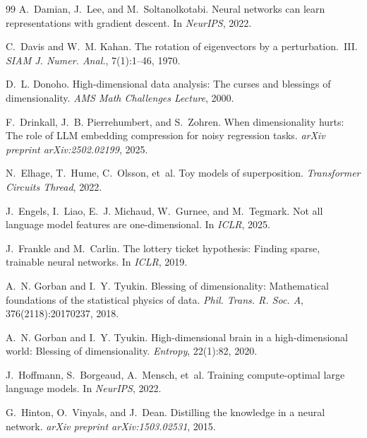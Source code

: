 \documentclass[11pt,a4paper]{article}
\theoremstyle{plain}
\theoremstyle{definition}
\theoremstyle{remark}
\begin{document}
\begin{thebibliography}{99}
A.~Damian, J.~Lee, and M.~Soltanolkotabi.
\newblock Neural networks can learn representations with gradient descent.
\newblock In \emph{NeurIPS}, 2022.

C.~Davis and W.~M. Kahan.
\newblock The rotation of eigenvectors by a perturbation.~{III}.
\newblock \emph{SIAM J. Numer. Anal.}, 7(1):1--46, 1970.

D.~L. Donoho.
\newblock High-dimensional data analysis: The curses and blessings of
  dimensionality.
\newblock \emph{AMS Math Challenges Lecture}, 2000.

F.~Drinkall, J.~B. Pierrehumbert, and S.~Zohren.
\newblock When dimensionality hurts: The role of {LLM} embedding compression for
  noisy regression tasks.
\newblock \emph{arXiv preprint arXiv:2502.02199}, 2025.

N.~Elhage, T.~Hume, C.~Olsson, et~al.
\newblock Toy models of superposition.
\newblock \emph{Transformer Circuits Thread}, 2022.

J.~Engels, I.~Liao, E.~J. Michaud, W.~Gurnee, and M.~Tegmark.
\newblock Not all language model features are one-dimensional.
\newblock In \emph{ICLR}, 2025.

J.~Frankle and M.~Carlin.
\newblock The lottery ticket hypothesis: Finding sparse, trainable neural
  networks.
\newblock In \emph{ICLR}, 2019.

A.~N. Gorban and I.~Y. Tyukin.
\newblock Blessing of dimensionality: Mathematical foundations of the
  statistical physics of data.
\newblock \emph{Phil. Trans. R. Soc. A}, 376(2118):20170237, 2018.

A.~N. Gorban and I.~Y. Tyukin.
\newblock High-dimensional brain in a high-dimensional world: Blessing of
  dimensionality.
\newblock \emph{Entropy}, 22(1):82, 2020.

J.~Hoffmann, S.~Borgeaud, A.~Mensch, et~al.
\newblock Training compute-optimal large language models.
\newblock In \emph{NeurIPS}, 2022.

G.~Hinton, O.~Vinyals, and J.~Dean.
\newblock Distilling the knowledge in a neural network.
\newblock \emph{arXiv preprint arXiv:1503.02531}, 2015.


\end{thebibliography}
\end{document}
